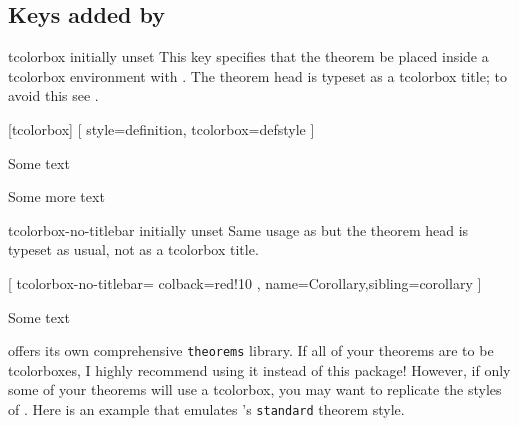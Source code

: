 \documentclass{ltxdoc}
\begin{document}
\subsection{Keys added by } \label{thm-added-keys}

\begin{docKey}{tcolorbox}
  {}
  {initially unset}
This key specifies that the theorem be placed inside a tcolorbox environment with .
The theorem head is typeset as a tcolorbox title; to avoid this see .

\begin{tcbwritetemp}
[tcolorbox]
[
  style=definition,
  tcolorbox={defstyle}
  ]
\end{tcbwritetemp}

\begin{keythmscode}[withpreamble]
\begin{corollary}
Some text
\end{corollary}
\begin{definition}
Some more text
\end{definition}
\end{keythmscode}

\end{docKey}

\begin{docKey}{tcolorbox-no-titlebar}
  {}
  {initially unset}
Same usage as  but the theorem head is typeset as usual, not as a tcolorbox title.

\begin{tcbwritetemp}
[
  tcolorbox-no-titlebar={
    colback=red!10
    },
  name=Corollary,sibling=corollary
  ]
\end{tcbwritetemp}

\begin{keythmscode}[withpreamble]
\begin{boxcor}
Some text
\end{boxcor}
\end{keythmscode}

\end{docKey}

 offers its own comprehensive \texttt{theorems} library. If all of your theorems are to be tcolorboxes, I highly recommend using it instead of this package! However, if only some of your theorems will use a tcolorbox, you may want to replicate the styles of . Here is an example that emulates 's \texttt{standard} theorem style.
\end{document}
